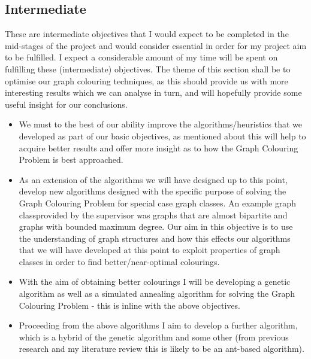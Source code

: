 \documentclass[12pt, a4paper]{article}
\begin{document}
\subsection*{Intermediate}
These are intermediate objectives that I would expect to be completed in the mid-stages of the project and would consider essential in order for my project aim to be fulfilled. I expect a considerable amount of my time will be spent on fulfilling these (intermediate) objectives. The theme of this section shall be to optimise our graph colouring techniques, as this should provide us with more interesting results which we can analyse in turn, and will hopefully provide some useful insight for our conclusions.
\begin{itemize}
\renewcommand\labelitemi{\tiny$\bullet$}
\item We must to the best of our ability improve the algorithms/heuristics that we developed as part of our basic objectives, as mentioned about this will help to acquire better results and offer more insight as to how the Graph Colouring Problem is best approached.
\item As an extension of the algorithms we will have designed up to this point, develop new algorithms designed with the specific purpose of solving the Graph Colouring Problem for special case graph classes. An example graph classprovided by the supervisor was graphs that are almost bipartite and graphs with bounded maximum degree. Our aim in this objective is to use the understanding of graph structures and how this effects our algorithms that we will have developed at this point to exploit properties of graph classes in order to find better/near-optimal colourings.
\item With the aim of obtaining better colourings I will be developing a genetic algorithm as well as a simulated annealing algorithm for solving the Graph Colouring Problem - this is inline with the above objectives.
\item Proceeding from the above algorithms I aim to develop a further algorithm, which is a hybrid of the genetic algorithm and some other (from previous research and my literature review this is likely to be an ant-based algorithm). 
\end{itemize}  
\end{document}
